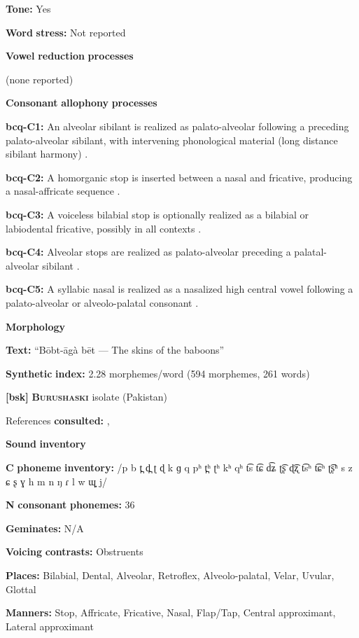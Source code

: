 \begin{styleBody}
\textbf{Tone:} Yes

\textbf{Word} \textbf{stress:} Not reported

\textbf{Vowel} \textbf{reduction} \textbf{processes}

(none reported)

\textbf{Consonant} \textbf{allophony} \textbf{processes}

\textbf{bcq-C1:} An alveolar sibilant is realized as palato-alveolar following a preceding palato-alveolar sibilant, with intervening phonological material (long distance sibilant harmony) \citep[67]{Rapold2006}.

\textbf{bcq-C2:} A homorganic stop is inserted between a nasal and fricative, producing a nasal-affricate sequence \citep[69]{Rapold2006}.

\textbf{bcq-C3:} A voiceless bilabial stop is optionally realized as a bilabial or labiodental fricative, possibly in all contexts \citep[73]{Rapold2006}.

\textbf{bcq-C4:} Alveolar stops are realized as palato-alveolar preceding a palatal-alveolar sibilant \citep[74]{Rapold2006}.

\textbf{bcq-C5:} A syllabic nasal is realized as a nasalized high central vowel following a palato-alveolar or alveolo-palatal consonant \citep[76]{Rapold2006}.

\textbf{Morphology}

\textbf{Text:} “Bōbt-āgà bēt — The skins of the baboons” \citep[594-599]{Rapold2006}

\textbf{Synthetic} \textbf{index:} 2.28 morphemes/word (594 morphemes, 261 words)

\textbf{[bsk]}   \textbf{\textsc{Burushaski}}  isolate (Pakistan)

References \textbf{consulted:} \citet{Anderson1997}, \citet{Yoshioka2012}

\textbf{Sound} \textbf{inventory}

\textbf{C} \textbf{phoneme} \textbf{inventory:} /p b t̪ d̪ ʈ ɖ k ɡ q pʰ t̪ʰ ʈʰ kʰ qʰ t͡s t͡ɕ d͡ʑ ʈ͡ʂ ɖ͡ʐ t͡sʰ t͡ɕʰ ʈ͡ʂʰ s z ɕ ʂ ɣ h m n ŋ ɾ l w ɰ̟ j/

\textbf{N} \textbf{consonant} \textbf{phonemes:} 36

\textbf{Geminates:} N/A

\textbf{Voicing} \textbf{contrasts:} Obstruents

\textbf{Places:} Bilabial, Dental, Alveolar, Retroflex, Alveolo-palatal, Velar, Uvular, Glottal

\textbf{Manners:} Stop, Affricate, Fricative, Nasal, Flap/Tap, Central approximant, Lateral approximant


\end{styleBody}
